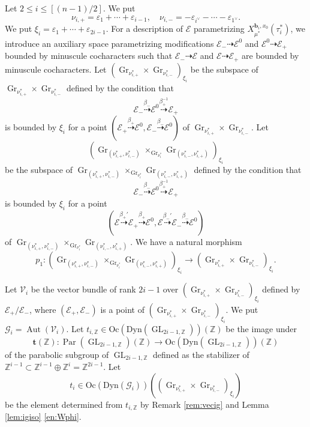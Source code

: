\documentclass[12pt,a4paper]{article}
\DeclareMathOperator{\Aut}{Aut}
\DeclareMathOperator{\Gr}{Gr}
\DeclareMathOperator{\Par}{Par}
\DeclareMathOperator{\GL}{GL}
\newcommand{\bZ}{\mathbb{Z}}
\newcommand{\bfb}{\mathbf{b}}
\newcommand{\cE}{\mathcal{E}}
\newcommand{\sG}{\mathscr{G}}
\newcommand{\sV}{\mathscr{V}}
\begin{document}
Let $2 \leq i \leq [(n-1)/2]$. 
We put 
\[
 \nu_{i,+} =\varepsilon_1 + \cdots +\varepsilon_{i-1}, \quad 
 \nu_{i,-} =-\varepsilon_{i^{\vee}}-\cdots-\varepsilon_{1^{\vee}}. 
\]
We put $\xi_i = \varepsilon_1 + \cdots + \varepsilon_{2i-1}$. 
For a description of $\cE$ parametrizing $X_{\mu^*}^{\bfb_i,x_0}(\tau_i^*)$, 
we introduce an auxiliary space parametrizing modifications $\cE_- \dashrightarrow \cE^0$ and $\cE^0 \dashrightarrow \cE_+$ bounded by minuscule cocharacters such that $\cE_- \dashrightarrow \cE$ and $\cE \dashrightarrow \cE_+$ are bounded by minuscule cocharacters. 
Let $(\Gr_{\nu_{i,+}^*} \times \Gr_{\nu_{i,-}^*})_{\xi_i}$ 
be the subspace of 
$\Gr_{\nu_{i,+}^*} \times \Gr_{\nu_{i,-}^*}$ 
defined by the condition that 
\[
 \cE_- \stackrel{\beta_-}{\dashrightarrow} \cE^0 \stackrel{\beta_+^{-1}}{\dashrightarrow} \cE_+ 
\]
is bounded by $\xi_i$ 
for a point 
$(\cE_+ \stackrel{\beta_+}{\dashrightarrow} \cE^0, 
 \cE_- \stackrel{\beta_-}{\dashrightarrow} \cE^0)$ 
of 
$\Gr_{\nu_{i,+}^*} \times \Gr_{\nu_{i,-}^*}$. 
Let 
\[
 (\Gr_{(\nu_{i,+}^*,\nu_{i,-}^*)} \times_{\Gr_{\nu_i^*}} \Gr_{(\nu_{i,-}^*,\nu_{i,+}^*)})_{\xi_i}
 \] 
be the subspace of 
$\Gr_{(\nu_{i,+}^*,\nu_{i,-}^*)} \times_{\Gr_{\nu_i^*}} \Gr_{(\nu_{i,-}^*,\nu_{i,+}^*)}$ 
defined by the condition that 
\[
 \cE_- \stackrel{\beta_-}{\dashrightarrow} \cE^0 \stackrel{\beta_+^{-1}}{\dashrightarrow} \cE_+ 
\]
is bounded by $\xi_i$ for a point
\[
 (\cE \stackrel{\beta_+'}{\dashrightarrow}
 \cE_+ \stackrel{\beta_+}{\dashrightarrow} \cE^0, \cE \stackrel{\beta_-'}{\dashrightarrow}
 \cE_- \stackrel{\beta_-}{\dashrightarrow} \cE^0)
\]
of $\Gr_{(\nu_{i,+}^*,\nu_{i,-}^*)} \times_{\Gr_{\nu_i^*}} \Gr_{(\nu_{i,-}^*,\nu_{i,+}^*)}$. 
We have a natural morphism 
\[
 p_1 \colon 
 (\Gr_{(\nu_{i,+}^*,\nu_{i,-}^*)} \times_{\Gr_{\nu_i^*}} \Gr_{(\nu_{i,-}^*,\nu_{i,+}^*)})_{\xi_i} \to 
 (\Gr_{\nu_{i,+}^*} \times \Gr_{\nu_{i,-}^*})_{\xi_i}. 
\]

Let $\sV_i$ be the vector bundle of rank $2i-1$ over 
$(\Gr_{\nu_{i,+}^*} \times \Gr_{\nu_{i,-}^*})_{\xi_i}$ 
defined by $\cE_+ /\cE_-$, where 
$(\cE_+, \cE_-)$ is a point of 
$(\Gr_{\nu_{i,+}^*} \times \Gr_{\nu_{i,-}^*})_{\xi_i}$. 
We put $\sG_i=\Aut (\sV_i)$. 
Let 
$t_{i,\bZ} \in \mathrm{Oc}(\mathrm{Dyn}(\GL_{2i-1,\bZ}))(\bZ)$ 
be the image under 
\[
  \mathbf{t}(\bZ) \colon \Par (\GL_{2i-1,\bZ})(\bZ) \to \mathrm{Oc}(\mathrm{Dyn}(\GL_{2i-1,\bZ}))(\bZ)  
\]
of the parabolic subgroup of $\GL_{2i-1,\bZ}$ 
defined as the stabilizer of 
$\bZ^{i-1} \subset \bZ^{i-1} \oplus \bZ^i = \bZ^{2i-1}$. 
Let 
\begin{equation}\label{eq:tidef}
 t_i \in \mathrm{Oc}(\mathrm{Dyn}(\sG_i))((\Gr_{\nu_{i,+}^*} \times \Gr_{\nu_{i,-}^*})_{\xi_i})
\end{equation}
be the element determined from $t_{i,\bZ}$ by 
Remark \ref{rem:vecig} and Lemma \ref{lem:igiso} \ref{en:Wphi}. 
\end{document}
